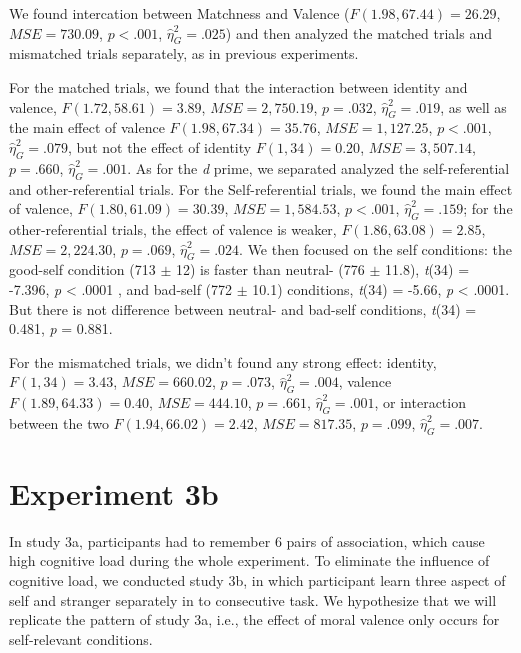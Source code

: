 \documentclass[
  english,
  man]{apa6}
\begin{document}
We found intercation between Matchness and Valence (\(F(1.98, 67.44) = 26.29\), \(\mathit{MSE} = 730.09\), \(p < .001\), \(\hat{\eta}^2_G = .025\)) and then analyzed the matched trials and mismatched trials separately, as in previous experiments.

For the matched trials, we found that the interaction between identity and valence, \(F(1.72, 58.61) = 3.89\), \(\mathit{MSE} = 2,750.19\), \(p = .032\), \(\hat{\eta}^2_G = .019\), as well as the main effect of valence \(F(1.98, 67.34) = 35.76\), \(\mathit{MSE} = 1,127.25\), \(p < .001\), \(\hat{\eta}^2_G = .079\), but not the effect of identity \(F(1, 34) = 0.20\), \(\mathit{MSE} = 3,507.14\), \(p = .660\), \(\hat{\eta}^2_G = .001\). As for the \emph{d} prime, we separated analyzed the self-referential and other-referential trials. For the Self-referential trials, we found the main effect of valence, \(F(1.80, 61.09) = 30.39\), \(\mathit{MSE} = 1,584.53\), \(p < .001\), \(\hat{\eta}^2_G = .159\); for the other-referential trials, the effect of valence is weaker, \(F(1.86, 63.08) = 2.85\), \(\mathit{MSE} = 2,224.30\), \(p = .069\), \(\hat{\eta}^2_G = .024\). We then focused on the self conditions: the good-self condition (713 \(\pm\) 12) is faster than neutral- (776 \(\pm\) 11.8), \emph{t}(34) = -7.396, \emph{p} \textless{} .0001 , and bad-self (772 \(\pm\) 10.1) conditions, \emph{t}(34) = -5.66, \emph{p} \textless{} .0001. But there is not difference between neutral- and bad-self conditions, \emph{t}(34) = 0.481, \emph{p} = 0.881.

For the mismatched trials, we didn't found any strong effect: identity, \(F(1, 34) = 3.43\), \(\mathit{MSE} = 660.02\), \(p = .073\), \(\hat{\eta}^2_G = .004\), valence \(F(1.89, 64.33) = 0.40\), \(\mathit{MSE} = 444.10\), \(p = .661\), \(\hat{\eta}^2_G = .001\), or interaction between the two \(F(1.94, 66.02) = 2.42\), \(\mathit{MSE} = 817.35\), \(p = .099\), \(\hat{\eta}^2_G = .007\).

\hypertarget{experiment-3b}{%
\section{Experiment 3b}\label{experiment-3b}}

In study 3a, participants had to remember 6 pairs of association, which cause high cognitive load during the whole experiment. To eliminate the influence of cognitive load, we conducted study 3b, in which participant learn three aspect of self and stranger separately in to consecutive task. We hypothesize that we will replicate the pattern of study 3a, i.e., the effect of moral valence only occurs for self-relevant conditions.
\end{document}
